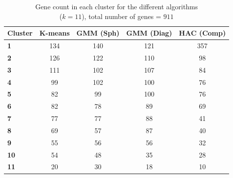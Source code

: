\begin{table}[H]
	\centering
	\begin{tabular}{lcccc}
		\hline
		\textbf{Cluster} & \textbf{K-means} & \textbf{GMM (Sph)} & \textbf{GMM (Diag)} & \textbf{HAC (Comp)}  \\ \hline
		\textbf{1}       & 134              & 140                & 121                 & 357                \\ \hline
		\textbf{2}       & 126              & 122                & 110                 & 98                 \\ \hline
		\textbf{3}       & 111              & 102                & 107                 & 84                 \\ \hline
		\textbf{4}       & 99               & 102                & 100                  & 76                   \\ \hline
		\textbf{5}       & 82               & 99                 & 100                  & 76                  \\ \hline
		\textbf{6}       & 82               & 78                 & 89                  & 69                   \\ \hline
		\textbf{7}       & 77               & 77                 & 88                  & 41                   \\ \hline
		\textbf{8}       & 69               & 57                 & 87                  & 40                  \\ \hline
		\textbf{9}       & 55               & 56                 & 56                  & 32                  \\ \hline
		\textbf{10}      & 54               & 48                 & 35                  & 28                  \\ \hline
		\textbf{11}      & 20              & 30                 & 18                  & 10                   \\ \hline
	\end{tabular}
	\caption{Gene count in each cluster for the different algorithms \\
	($k=11$), total number of genes = $911$}
	\label{tab: number of genes RNA Crude Mito}
\end{table}

